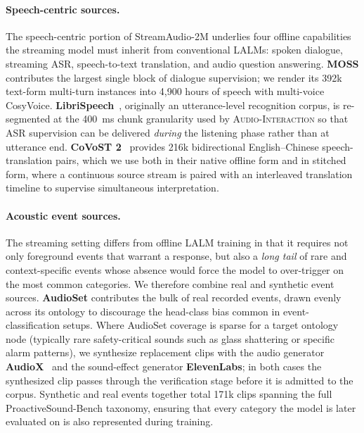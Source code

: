 \documentclass{article}
\begin{document}
\paragraph{Speech-centric sources.}
The speech-centric portion of StreamAudio-2M underlies four offline capabilities the
streaming model must inherit from conventional LALMs: spoken dialogue, streaming ASR,
speech-to-text translation, and audio question answering. \textbf{MOSS}
contributes the largest single block of dialogue supervision; we render its 392k
text-form multi-turn instances into 4{,}900 hours of speech with multi-voice CosyVoice.
\textbf{LibriSpeech}~\citep{panayotov2015librispeech}, originally an utterance-level
recognition corpus, is re-segmented at the 400~ms chunk granularity used by \textsc{Audio-Interaction}
so that ASR supervision can be delivered \emph{during} the listening phase rather than at
utterance end. \textbf{CoVoST 2}~\citep{wang2021covost} provides 216k bidirectional
English--Chinese speech-translation pairs, which we use both in their native offline form
and in stitched form, where a continuous source stream is paired with an interleaved
translation timeline to supervise simultaneous interpretation.


\paragraph{Acoustic event sources.}
The streaming setting differs from offline LALM training in that it requires not only
foreground events that warrant a response, but also a \emph{long tail} of rare and
context-specific events whose absence would force the model to over-trigger on the most
common categories. We therefore combine real and synthetic event sources.
\textbf{AudioSet} contributes the bulk of real recorded events, drawn evenly across its
ontology to discourage the head-class bias common in event-classification setups. Where
AudioSet coverage is sparse for a target ontology node (typically rare safety-critical
sounds such as glass shattering or specific alarm patterns), we synthesize replacement
clips with the audio generator \textbf{AudioX}~\citep{tian2025audiox} and the
sound-effect generator \textbf{ElevenLabs}; in both cases the synthesized clip passes
through the verification stage  before it is
admitted to the corpus. Synthetic and real events together total 171k clips spanning the
full ProactiveSound-Bench taxonomy, ensuring that
every category the model is later evaluated on is also represented during training.
\end{document}
